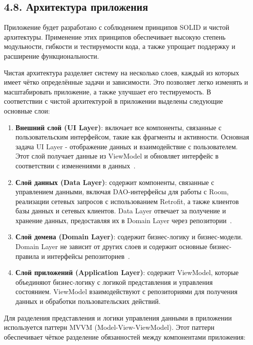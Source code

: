 \documentclass{vsureport}
\begin{document}
\subsection*{4.8. Архитектура приложения}

Приложение будет разработано с соблюдением принципов SOLID и чистой архитектуры. Применение этих принципов обеспечивает высокую степень модульности, гибкости и тестируемости кода, а также упрощает поддержку и расширение функциональности. \cite{ref3}

Чистая архитектура разделяет систему на несколько слоев, каждый из которых имеет чётко определённые задачи и зависимости. Это позволяет легко изменять и масштабировать приложение, а также улучшает его тестируемость. В соответствии с чистой архитектурой в приложении выделены следующие основные слои:

\begin{enumerate}
    \item \textbf{Внешний слой (UI Layer)}: включает все компоненты, связанные с пользовательским интерфейсом, такие как фрагменты и активности. Основная задача UI Layer - отображение данных и взаимодействие с пользователем. Этот слой получает данные из ViewModel и обновляет интерфейс в соответствии с изменениями в данных~\cite{ref3}.
    \item \textbf{Слой данных (Data Layer)}: содержит компоненты, связанные с управлением данными, включая DAO-интерфейсы для работы с Room, реализации сетевых запросов с использованием Retrofit, а также клиентов базы данных и сетевых клиентов. Data Layer отвечает за получение и хранение данных, предоставляя их в Domain Layer через репозитории~\cite{ref3}.
    \item \textbf{Слой домена (Domain Layer)}: содержит бизнес-логику и бизнес-модели. Domain Layer не зависит от других слоев и содержит основные бизнес-правила и интерфейсы репозиториев~\cite{ref3}.
    \item \textbf{Слой приложений (Application Layer)}: содержит ViewModel, которые объединяют бизнес-логику с логикой представления и управления состоянием. ViewModel взаимодействуют с репозиториями для получения данных и обработки пользовательских действий.
\end{enumerate}

Для разделения представления и логики управления данными в приложении используется паттерн MVVM (Model-View-ViewModel). Этот паттерн обеспечивает чёткое разделение обязанностей между компонентами приложения:
\end{document}
